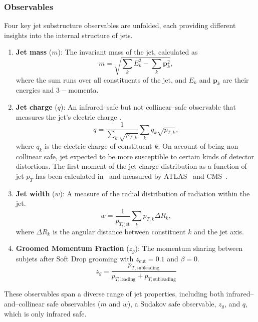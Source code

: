             \subsubsection{Observables}
                Four key jet substructure observables are unfolded, each providing different insights into the internal structure of jets.
                \begin{enumerate}
                \item \textbf{Jet mass} ($m$): The invariant mass of the jet, calculated as
                \[
                    m = \sqrt{\sum_k E_k^2 - \sum_k \mathbf{p}_k^2},
                \]
                where the sum runs over all constituents of the jet, and $E_k$ and $\mathbf{p}_k$ are their energies and \(3-\)momenta.
            \item \textbf{Jet charge} ($q$): An infrared--safe but not collinear--safe observable that measures the jet's electric charge .
            \[
                q = \frac{1}{\sum_k \sqrt{p_{T,k}}}\sum_k q_k \sqrt{p_{T,k}},
            \]
            where $q_k$ is the electric charge of constituent $k$.
            On account of being non collinear safe, jet expected to be more susceptible to certain kinds of detector distortions.
            The first moment of the jet charge distribution as a function of jet $p_T$ has been calculated in~\cite{Krohn2013JetLHC,Waalewijn2012CalculatingJet,Li:2019dre,Li2020JetMatter,Kang2020JetCollider} and measured by ATLAS~\cite{ATLAS:2015rlw} and CMS~\cite{CMS:2017yer,CMS:2020plq}.
            \item \textbf{Jet width} ($w$): A measure of the radial distribution of radiation within the jet.
            \[
                w = \frac{1}{p_{T,\text{jet}}}\sum_k p_{T,k} \Delta R_k,
            \]
            where $\Delta R_k$ is the angular distance between constituent $k$ and the jet axis.
            \item \textbf{Groomed Momentum Fraction} ($z_g$): The momentum sharing between subjets after Soft Drop grooming  with $z_{\text{cut}} = 0.1$ and $\beta = 0$.
            \[
                z_g = \frac{p_{T,\text{subleading}}}{p_{T,\text{leading}} + p_{T,\text{subleading}}}
            \]
            \end{enumerate}
            These observables span a diverse range of jet properties, including both infrared--and--collinear safe observables ($m$ and $w$), a Sudakov safe observable, \(z_g\), and \(q\), which is only infrared safe.
